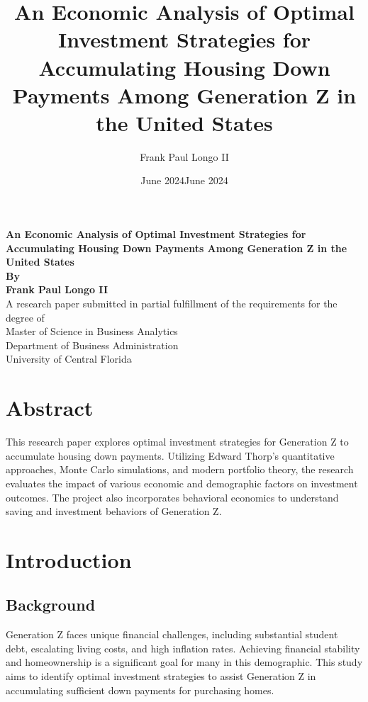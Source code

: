 \documentclass[12pt]{report}
\title{An Economic Analysis of Optimal Investment Strategies for Accumulating Housing Down Payments Among Generation Z in the United States}
\author{Frank Paul Longo II}
\date{June 2024}
\newcommand{\degree}{Master of Science in Business Analytics}
\newcommand{\department}{Department of Business Administration}
\newcommand{\university}{University of Central Florida}
\begin{document}
\begin{titlepage}
    \centering
    \vspace*{1in}
    
    {\Huge \textbf{An Economic Analysis of Optimal Investment Strategies for Accumulating Housing Down Payments Among Generation Z in the United States}}\\[2cm]
    
    \textbf{By}\\[0.5cm]
    \textbf{Frank Paul Longo II}\\[1.5cm]
    
    A research paper submitted in partial fulfillment of the requirements for the degree of\\[0.5cm]
    \degree\\[0.5cm]
    \department\\[0.5cm]
    \university\\[2cm]
    
    \date{June 2024}
    
    \vfill
\end{titlepage}

\tableofcontents
\listoffigures
\listoftables

\chapter*{Abstract}
This research paper explores optimal investment strategies for Generation Z to accumulate housing down payments. Utilizing Edward Thorp’s quantitative approaches, Monte Carlo simulations, and modern portfolio theory, the research evaluates the impact of various economic and demographic factors on investment outcomes. The project also incorporates behavioral economics to understand saving and investment behaviors of Generation Z.

\chapter{Introduction}
\section{Background}
Generation Z faces unique financial challenges, including substantial student debt, escalating living costs, and high inflation rates. Achieving financial stability and homeownership is a significant goal for many in this demographic. This study aims to identify optimal investment strategies to assist Generation Z in accumulating sufficient down payments for purchasing homes.
\end{document}
